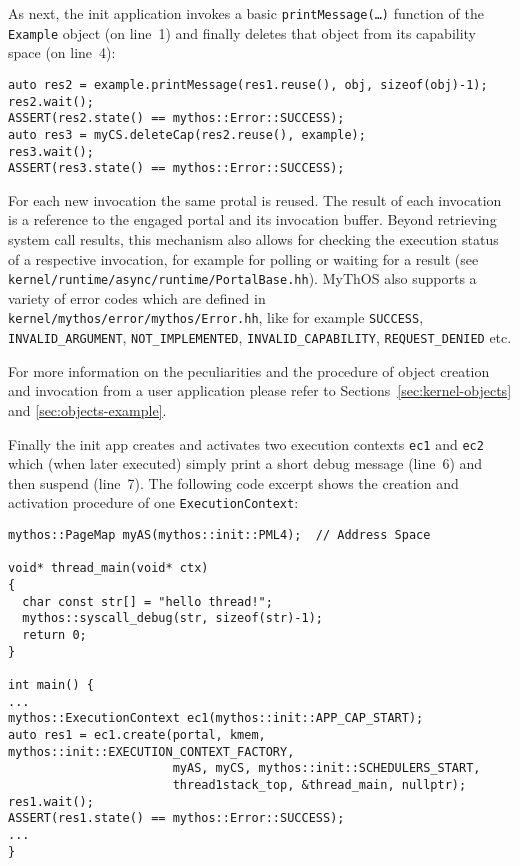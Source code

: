 As next, the init application invokes a basic \texttt{printMessage(\ldots)}
function of the \texttt{Example} object (on line~1) and finally deletes that
object from its capability space (on line~4):

\lstset{language=c++}
\begin{lstlisting}
auto res2 = example.printMessage(res1.reuse(), obj, sizeof(obj)-1);
res2.wait();
ASSERT(res2.state() == mythos::Error::SUCCESS);
auto res3 = myCS.deleteCap(res2.reuse(), example);
res3.wait();
ASSERT(res3.state() == mythos::Error::SUCCESS);
\end{lstlisting}

\noindent For each new invocation the same protal is reused. The result of each
invocation is a reference to the engaged portal and its invocation buffer.
Beyond retrieving system call results, this mechanism also allows for checking
the execution status of a respective invocation, for example for polling or
waiting for a result (see \texttt{kernel/runtime/async/runtime/PortalBase.hh}).
MyThOS also supports a variety of error codes which are defined in
\texttt{kernel/mythos/error/mythos/Error.hh}, like for example \texttt{SUCCESS},
\texttt{INVALID\_ARGUMENT}, \texttt{NOT\_IMPLEMENTED},
\texttt{INVALID\_CAPABILITY}, \texttt{REQUEST\_DENIED} etc.

For more information on the peculiarities
and the procedure of object creation and invocation from a user application
please refer to Sections~\ref{sec:kernel-objects} and \ref{sec:objects-example}.

Finally the init app creates and activates two execution contexts \texttt{ec1}
and \texttt{ec2} which (when later executed) simply print a short debug message
(line~6) and then suspend (line~7). The following code excerpt shows the
creation and activation procedure of one \texttt{ExecutionContext}:

\lstset{language=c++}
\begin{lstlisting}
mythos::PageMap myAS(mythos::init::PML4);  // Address Space

void* thread_main(void* ctx)
{
  char const str[] = "hello thread!";
  mythos::syscall_debug(str, sizeof(str)-1);
  return 0;
}

int main() {
...
mythos::ExecutionContext ec1(mythos::init::APP_CAP_START);
auto res1 = ec1.create(portal, kmem, mythos::init::EXECUTION_CONTEXT_FACTORY,
                       myAS, myCS, mythos::init::SCHEDULERS_START,
                       thread1stack_top, &thread_main, nullptr);
res1.wait();
ASSERT(res1.state() == mythos::Error::SUCCESS);
...
}
\end{lstlisting}

